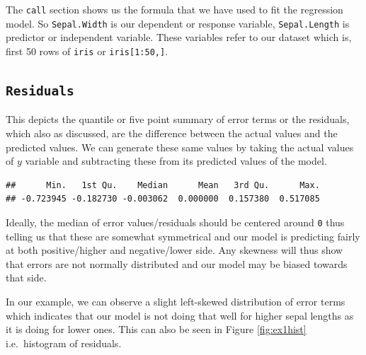 \documentclass[
]{book}
\newenvironment{Shaded}{\begin{snugshade}}{\end{snugshade}}
\newcommand{\DecValTok}[1]{\textcolor[rgb]{0.00,0.00,0.81}{#1}}
\newcommand{\FunctionTok}[1]{\textcolor[rgb]{0.13,0.29,0.53}{\textbf{#1}}}
\newcommand{\NormalTok}[1]{#1}
\newcommand{\SpecialCharTok}[1]{\textcolor[rgb]{0.81,0.36,0.00}{\textbf{#1}}}
\begin{document}
The \texttt{call} section shows us the formula that we have used to fit the regression model. So \texttt{Sepal.Width} is our dependent or response variable, \texttt{Sepal.Length} is predictor or independent variable. These variables refer to our dataset which is, first 50 rows of \texttt{iris} or \texttt{iris{[}1:50,{]}}.

\hypertarget{residuals}{%
\subsection{\texorpdfstring{\texttt{Residuals}}{Residuals}}\label{residuals}}

This depicts the quantile or five point summary of error terms or the residuals, which also as discussed, are the difference between the actual values and the predicted values. We can generate these same values by taking the actual values of \(y\) variable and subtracting these from its predicted values of the model.

\begin{Shaded}
\end{Shaded}

\begin{verbatim}
##      Min.   1st Qu.    Median      Mean   3rd Qu.      Max. 
## -0.723945 -0.182730 -0.003062  0.000000  0.157380  0.517085
\end{verbatim}

Ideally, the median of error values/residuals should be centered around \texttt{0} thus telling us that these are somewhat symmetrical and our model is predicting fairly at both positive/higher and negative/lower side. Any skewness will thus show that errors are not normally distributed and our model may be biased towards that side.

In our example, we can observe a slight left-skewed distribution of error terms which indicates that our model is not doing that well for higher sepal lengths as it is doing for lower ones. This can also be seen in Figure \ref{fig:ex1hist} i.e.~histogram of residuals.
\end{document}
